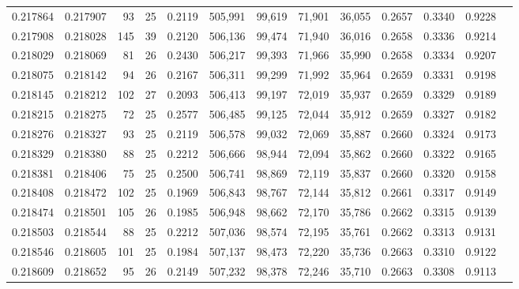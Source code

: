 \begin{tabular}{rrrrrrrrrrrrr}
0.217864 & 0.217907 &  93 &  25 &                                     0.2119 & 505,991 &  99,619 &  71,901 &  36,055 & 0.2657 & 0.3340 & 0.9228 \\
0.217908 & 0.218028 & 145 &  39 &                                     0.2120 & 506,136 &  99,474 &  71,940 &  36,016 & 0.2658 & 0.3336 & 0.9214 \\
0.218029 & 0.218069 &  81 &  26 &                                     0.2430 & 506,217 &  99,393 &  71,966 &  35,990 & 0.2658 & 0.3334 & 0.9207 \\
0.218075 & 0.218142 &  94 &  26 &                                     0.2167 & 506,311 &  99,299 &  71,992 &  35,964 & 0.2659 & 0.3331 & 0.9198 \\
0.218145 & 0.218212 & 102 &  27 &                                     0.2093 & 506,413 &  99,197 &  72,019 &  35,937 & 0.2659 & 0.3329 & 0.9189 \\
0.218215 & 0.218275 &  72 &  25 &                                     0.2577 & 506,485 &  99,125 &  72,044 &  35,912 & 0.2659 & 0.3327 & 0.9182 \\
0.218276 & 0.218327 &  93 &  25 &                                     0.2119 & 506,578 &  99,032 &  72,069 &  35,887 & 0.2660 & 0.3324 & 0.9173 \\
0.218329 & 0.218380 &  88 &  25 &                                     0.2212 & 506,666 &  98,944 &  72,094 &  35,862 & 0.2660 & 0.3322 & 0.9165 \\
0.218381 & 0.218406 &  75 &  25 &                                     0.2500 & 506,741 &  98,869 &  72,119 &  35,837 & 0.2660 & 0.3320 & 0.9158 \\
0.218408 & 0.218472 & 102 &  25 &                                     0.1969 & 506,843 &  98,767 &  72,144 &  35,812 & 0.2661 & 0.3317 & 0.9149 \\
0.218474 & 0.218501 & 105 &  26 &                                     0.1985 & 506,948 &  98,662 &  72,170 &  35,786 & 0.2662 & 0.3315 & 0.9139 \\
0.218503 & 0.218544 &  88 &  25 &                                     0.2212 & 507,036 &  98,574 &  72,195 &  35,761 & 0.2662 & 0.3313 & 0.9131 \\
0.218546 & 0.218605 & 101 &  25 &                                     0.1984 & 507,137 &  98,473 &  72,220 &  35,736 & 0.2663 & 0.3310 & 0.9122 \\
0.218609 & 0.218652 &  95 &  26 &                                     0.2149 & 507,232 &  98,378 &  72,246 &  35,710 & 0.2663 & 0.3308 & 0.9113 \\

\end{tabular}
